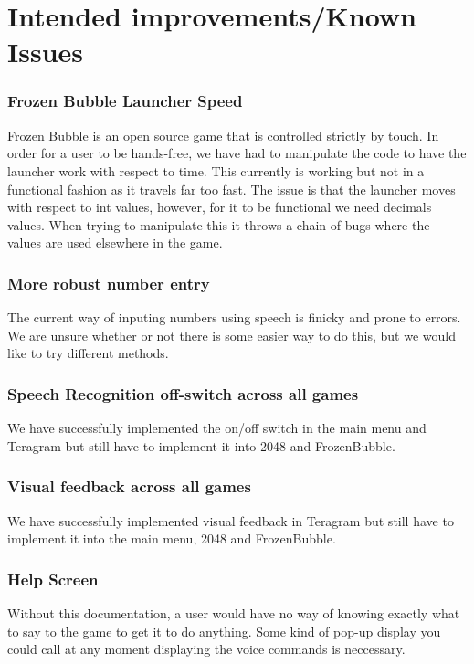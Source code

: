 \documentclass[11pt, oneside]{article}
\begin{document}
\pagebreak

\section*{Intended improvements/Known Issues}

\subsubsection*{Frozen Bubble Launcher Speed}
Frozen Bubble is an open source game that is controlled strictly by touch. 
In order for a user to be hands-free, we have had to manipulate the code 
to have the launcher work with respect to time. This currently is working
but not in a functional fashion as it travels far too fast. The issue is 
that the launcher moves with respect to int values, however, for it to be 
functional we need decimals values. When trying to manipulate this it 
throws a chain of bugs where the values are used elsewhere in the game. 

\subsubsection*{More robust number entry}
The current way of inputing numbers using speech is finicky and prone to
errors. We are unsure whether or not there is some easier way to do this,
but we would like to try different methods.

\subsubsection*{Speech Recognition off-switch across all games}
We have successfully implemented the on/off switch in the main menu and 
Teragram but still have to implement it into 2048 and FrozenBubble.

\subsubsection*{Visual feedback across all games}
We have successfully implemented visual feedback in Teragram but still 
have to implement it into the main menu, 2048 and FrozenBubble.

\subsubsection*{Help Screen}
Without this documentation, a user would have no way of knowing exactly 
what to say to the game to get it to do anything. Some kind of pop-up 
display you could call at any moment displaying the voice commands is
neccessary. 
\end{document}
